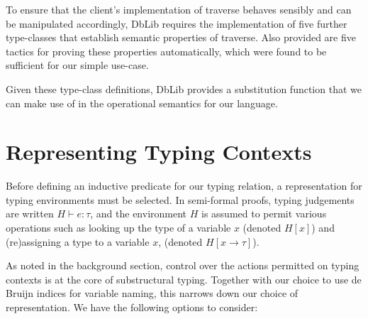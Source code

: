 \documentclass[]{unswthesis}
\begin{document}
To ensure that the client's implementation of traverse behaves sensibly and can be manipulated accordingly, DbLib requires the implementation of five further type-classes that establish semantic properties of traverse. Also provided are five tactics for proving these properties automatically, which were found to be sufficient for our simple use-case.

Given these type-class definitions, DbLib provides a substitution function that we can make use of in the operational semantics for our language.

\section{Representing Typing Contexts}

Before defining an inductive predicate for our typing relation, a representation for typing environments must be selected. In semi-formal proofs, typing judgements are written $H \vdash e : \tau$, and the environment $H$ is assumed to permit various operations such as looking up the type of a variable $x$ (denoted $H[x]$) and (re)assigning a type to a variable $x$, (denoted $H[x \to \tau]$).

As noted in the background section, control over the actions permitted on typing contexts is at the core of substructural typing. Together with our choice to use de Bruijn indices for variable naming, this narrows down our choice of representation. We have the following options to consider:
\end{document}
